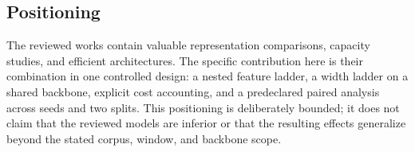 \subsection{Positioning}
The reviewed works contain valuable representation comparisons, capacity
studies, and efficient architectures. The specific contribution here is their
combination in one controlled design: a nested feature ladder, a width ladder
on a shared backbone, explicit cost accounting, and a predeclared paired
analysis across seeds and two splits. This positioning is deliberately
bounded; it does not claim that the reviewed models are inferior or that the
resulting effects generalize beyond the stated corpus, window, and backbone
scope.
